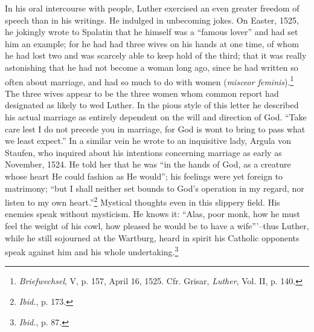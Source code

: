 In his oral intercourse with people, Luther exercised an even greater
freedom of speech than in his writings. He indulged in unbecoming
jokes. On Easter, 1525, he jokingly wrote to Spalatin that he himself
was a “famous lover” and had set him an example; for he had had
three wives on his hands at one time, of whom he had lost two and
was scarcely able to keep hold of the third; that it was really astonishing
that he had not become a woman long ago, since he had written
so often about marriage, and had so much to do with women (\textit{misceor
feminis}).\footnote
{\textit{Briefwechsel}, V, p. 157, April 16, 1525. Cfr. Grisar, \textit{Luther}, Vol. II, p. 140.}
The three wives appear to be the three women whom
common report had designated as likely to wed Luther.
In the pious style of this letter he described his actual marriage as
entirely dependent on the will and direction of God. “Take care lest
I do not precede you in marriage, for God is wont to bring to pass
what we least expect.” In a similar vein he wrote to an inquisitive
lady, Argula von Staufen, who inquired about his intentions concerning
marriage as early as November, 1524. He told her that he was
“in the hands of God, as a creature whose heart He could fashion as
He would”; his feelings were yet foreign to matrimony; “but I shall
neither set bounds to God’s operation in my regard, nor listen to my
own heart.”\footnote{\textit{Ibid.}, p. 173.}
Mystical thoughts even in this slippery field. His enemies
speak without mysticism. He knows it: “Alas, poor monk, how
he must feel the weight of his cowl, how pleased he would be to have
a wife”’--thus Luther, while he still sojourned at the Wartburg, heard
in spirit his Catholic opponents speak against him and his whole undertaking.\footnote
{\textit{Ibid.}, p. 87.}

